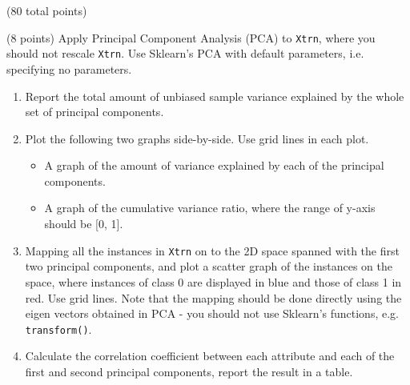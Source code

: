 \documentclass[12pt]{article}
\begin{document}
\begin{question}{(80 total points) \qOneTitle}
\begin{subquestion}{(8 points)
    Apply Principal Component Analysis (PCA) to {\tt Xtrn}, where you should not rescale {\tt Xtrn}.
    Use Sklearn's PCA with default parameters, i.e. specifying no parameters.
  }\label{q1:pca:wo/s}
  \begin{enumerate}\NARROWITEM
  \item Report the total amount of unbiased sample variance explained by the whole set of principal components.
  \item Plot the following two graphs side-by-side. Use grid lines in each plot.
    \begin{itemize}\NARROWITEM
    \item A graph of the amount of variance explained by each of the principal components.
    \item A graph of the cumulative variance ratio, where the range of y-axis should be [0, 1].
    \end{itemize}
  \item Mapping all the instances in {\tt Xtrn} on to the 2D space spanned with the first two principal components, and plot a scatter graph of the instances on the space, where instances of class 0 are displayed in blue and those of class 1 in red. Use grid lines. Note that the mapping should be done directly using the eigen vectors obtained in PCA - you should not use Sklearn's functions, e.g. {\tt transform()}. 
  \item Calculate the correlation coefficient between each attribute and each of the first and second principal components, report the result in a table.
  \end{enumerate}
   


\end{subquestion}
\end{question}
\end{document}

